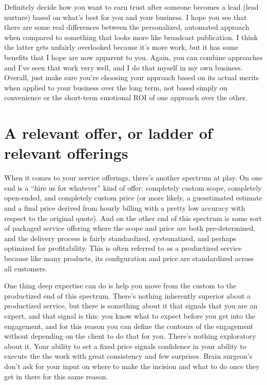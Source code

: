 Definitely decide how you want to earn trust after someone becomes a lead (lead nurture) based on what's best for you and your business. I hope you see that there are some real differences between the personalized, automated approach when compared to something that looks more like broadcast publication. I think the latter gets unfairly overlooked because it's more work, but it has some benefits that I hope are now apparent to you. Again, you can combine approaches and I've seen that work very well, and I do that myself in my own business. Overall, just make sure you're choosing your approach based on its actual merits when applied to your business over the long term, not based simply on convenience or the short-term emotional ROI of one approach over the other.

\section{A relevant offer, or ladder of relevant offerings}

When it comes to your service offerings, there's another spectrum at play. On one end is a ``hire us for whatever'' kind of offer: completely custom scope, completely open-ended, and completely custom price (or more likely, a guesstimated estimate and a final price derived from hourly billing with a pretty low accuracy with respect to the original quote). And on the other end of this spectrum is some sort of packaged service offering where the scope and price are both pre-determined, and the delivery process is fairly standardized, systematized, and perhaps optimized for profitability. This is often referred to as a productized service because like many products, its configuration and price are standardized across all customers.

One thing deep expertise can do is help you move from the custom to the productized end of this spectrum. There's nothing inherently superior about a productized service, but there is something about it that signals that you are an expert, and that signal is this: you know what to expect before you get into the engagement, and for this reason you can define the contours of the engagement without depending on the client to do that for you. There's nothing exploratory about it. Your ability to set a fixed price signals confidence in your ability to execute the the work with great consistency and few surprises. Brain surgeon’s don’t ask for your input on where to make the incision and what to do once they get in there for this same reason.

